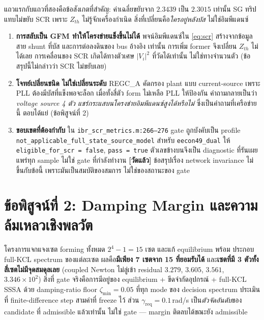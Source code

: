 \documentclass[11pt,a4paper]{article}
\newcommand{\code}[1]{\texttt{\small #1}}
\newcommand{\zmin}{\zeta_{\min}}
\newcommand{\mes}{\textcolor{ok}{\textbf{[วัดแล้ว]}}}
\begin{document}
\noindent
แถวแรกกับแถวที่สองคือข้อสังเกตที่สำคัญ: ค่าเฉลี่ยขยับจาก $2.3439$ เป็น $2.3015$
เท่านั้น SG ทริปแทบไม่ขยับ SCR เพราะ $Z_{th}$ ไม่รู้จักเครื่องกำเนิด
สิ่งที่เปลี่ยนคือ\emph{ใครอยู่หลังบัส} ไม่ใช่อิมพีแดนซ์

\begin{enumerate}
\item \textbf{การสลับเป็น GFM ทำให้โครงข่ายแข็งขึ้นไม่ได้} พจน์อิมพีแดนซ์ใน
      \eqref{eq:scr} สร้างจากข้อมูลสาย shunt ที่บัส และการต่อลงดินของ bus อ้างอิง
      เท่านั้น การเพิ่ม former จึงเปลี่ยน $Z_{th}$ ไม่ได้เลย การเคลื่อนของ SCR
      เกิดได้ทางตัวเศษ $|V_i|^2$ ที่วัดได้เท่านั้น ไม่ใช่ทางจำนวนตัว
      (ข้อสรุปนี้ไม่กล่าวว่า SCR ไม่ขยับเลย)
\item \textbf{โจทย์เปลี่ยนชนิด ไม่ใช่เปลี่ยนระดับ} REGC\_A คัดกรอง plant แบบ
      current-source เพราะ PLL ต้องมีบัสที่แข็งพอจะล็อก เมื่อทั้งสี่ตัว form
      ไม่เหลือ PLL ให้ป้องกัน คำถามกลายเป็นว่า \emph{voltage source 4 ตัว
      แชร์กระแสบนโครงข่ายอิมพีแดนซ์สูงได้หรือไม่} ซึ่งเป็นคำถามที่เครือข่ายนี้
      ตอบได้แย่ (ข้อพิสูจน์ที่ 2)
\item \textbf{ขอบเขตที่ต้องกำกับ} ใน \code{ibr\_scr\_metrics.m:266--276} gate
      ถูกบังคับเป็น profile \code{not\_applicable\_\allowbreak full\_state\_\allowbreak source\_model}
      สำหรับ \code{eecon49\_dual} ให้ \code{eligible\_for\_scr = false},
      \code{pass = true} ตัวเลขข้างบนจึงเป็น diagnostic ที่รันเผยแพร่ทุก sample
      ไม่ใช่ gate ที่กำลังทำงาน \mes{} ข้อสรุปเรื่อง network invariance
      ไม่ขึ้นกับข้อนี้ เพราะมันเป็นสมบัติของสมการ ไม่ใช่ของสถานะของ gate
\end{enumerate}

\section{ข้อพิสูจน์ที่ 2: Damping Margin และความล้มเหลวเชิงพลวัต}

\noindent
โครงการแจกแจงเซต forming ทั้งหมด $2^4-1 = 15$ เซต และแก้ equilibrium พร้อม
ประกอบ full-KCL spectrum ของแต่ละเซต ผลคือ\textbf{มีเพียง 7 เซตจาก 15
ที่ยอมรับได้} และ\textbf{เซตที่มี 3 ตัวทั้งสี่เซตไม่มีจุดสมดุลเลย} (coupled
Newton ไม่ลู่เข้า residual $3.279$, $3.605$, $3.561$, $3.346\times10^{2}$)
สิ่งที่ gate จริงคือการมีอยู่ของ equilibrium + ขีดจำกัดอุปกรณ์ + full-KCL SSSA
ด้วย damping-ratio floor $\zmin = 0.05$ ที่ทุก mode ของ decision spectrum
ประเมินที่ finite-difference step สามค่าที่ freeze ไว้ ส่วน
$\gamma_{\mathrm{req}} = 0.1$\,rad/s เป็น\emph{ตัวจัดอันดับ}ของ candidate
ที่ admissible แล้วเท่านั้น ไม่ใช่ gate --- margin ติดลบได้ขณะยัง admissible
\end{document}
